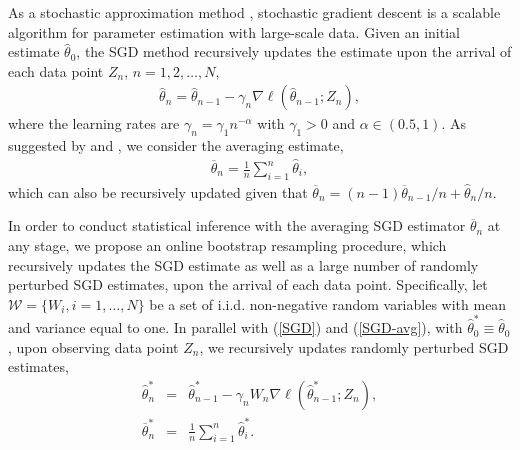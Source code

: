 \documentclass[twoside,11pt]{article}
\def\wh{\widehat}
\def\ol{\overline}
\begin{document}
As a stochastic approximation method \citep{Robbins51}, stochastic gradient descent is a scalable algorithm for parameter estimation with large-scale data. Given an initial estimate $\wh{\theta}_0$, the SGD method recursively updates the estimate upon the arrival of each data point $Z_n$, $n=1, 2, \dots, N$,
\begin{eqnarray}\label{SGD}
\wh{\theta}_n=\wh{\theta}_{n-1}-\gamma_n\nabla \ell(\wh{\theta}_{n-1}; Z_n),
\end{eqnarray}
where the learning rates are $\gamma_n=\gamma_1 n^{-\alpha}$ with $\gamma_1>0$ and $\alpha\in (0.5, 1)$. As suggested by \cite{Ruppert88} and \cite{Polyak92}, we consider the averaging estimate,
\begin{eqnarray}\label{SGD-avg}
\ol{\theta}_n=\frac{1}{n}\sum_{i=1}^n\wh{\theta}_i,
\end{eqnarray}
which can also be recursively updated given that $\ol{\theta}_n=(n-1)\ol{\theta}_{n-1}/n+\wh{\theta}_n/n$.

In order to conduct statistical inference with the averaging SGD estimator $\ol{\theta}_n$ at any stage, we propose an online bootstrap resampling procedure, which recursively updates the SGD estimate as well as a large number of randomly perturbed SGD estimates, upon the arrival of each data point. Specifically, let $\mathcal{W} = \{W_i, i = 1, \dots, N\}$ be a set of i.i.d. non-negative random variables with mean and variance equal to one. In parallel with (\ref{SGD}) and (\ref{SGD-avg}), with $\wh{\theta}^*_0\equiv \wh{\theta}_0$, upon observing data point $Z_n$, we recursively updates randomly perturbed SGD estimates,
\begin{eqnarray}
\wh{\theta}^*_n&=&\wh{\theta}^*_{n-1}-\gamma_nW_n\nabla \ell(\wh{\theta}^*_{n-1}; Z_n),\label{SGD-wt}\\
\ol{\theta}^*_n&=&\frac{1}{n}\sum_{i=1}^n\wh{\theta}^*_i.\label{SGD-avg-wt}
\end{eqnarray}
\end{document}
